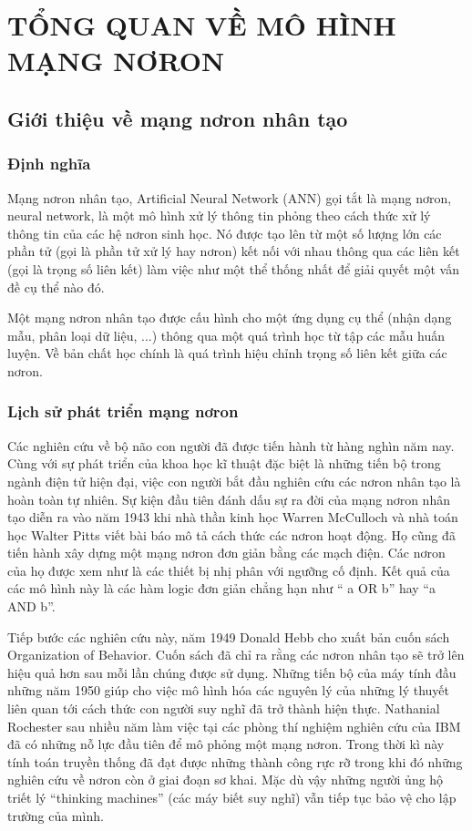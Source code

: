 \chapter{TỔNG QUAN VỀ MÔ HÌNH MẠNG NƠRON} \label{Appendix1}
\section{Giới thiệu về mạng nơron nhân tạo }
\subsection{Định nghĩa}
Mạng nơron nhân tạo, Artificial Neural Network (ANN) gọi tắt là mạng nơron, neural network, là một mô hình xử lý thông tin phỏng theo cách thức xử lý thông tin của các hệ nơron sinh học. Nó được tạo lên từ một số lượng lớn các phần tử (gọi là phần tử xử lý hay nơron) kết nối với nhau thông qua các liên kết (gọi là trọng số liên kết) làm việc như một thể thống nhất để giải quyết một vấn đề cụ thể nào đó. 

Một mạng nơron nhân tạo được cấu hình cho một ứng dụng cụ thể (nhận dạng mẫu, phân loại dữ liệu, ...) thông qua một quá trình học từ tập các mẫu huấn luyện. Về bản chất học chính là quá trình hiệu chỉnh trọng số liên kết giữa các nơron.
\subsection{Lịch sử phát triển mạng nơron}
Các nghiên cứu về bộ não con người đã được tiến hành từ hàng nghìn năm nay. Cùng với sự phát triển của khoa học kĩ thuật đặc biệt là những tiến bộ trong ngành điện tử hiện đại, việc con người bắt đầu nghiên cứu các nơron nhân tạo là hoàn toàn tự nhiên. Sự kiện đầu tiên đánh dấu sự ra đời của mạng nơron nhân tạo diễn ra vào năm 1943 khi nhà thần kinh học Warren McCulloch và nhà toán học Walter Pitts viết bài báo mô tả cách thức các nơron hoạt động. Họ cũng đã tiến hành xây dựng một mạng nơron đơn giản bằng các mạch điện. Các nơron của họ được xem như là các thiết bị nhị phân với ngưỡng cố định. Kết quả của các mô hình này là các hàm logic đơn giản chẳng hạn như “ a OR b” hay “a AND b”. 

Tiếp bước các nghiên cứu này, năm 1949 Donald Hebb cho xuất bản cuốn sách Organization of Behavior. Cuốn sách đã chỉ ra rằng các nơron nhân tạo sẽ trở lên hiệu quả hơn sau mỗi lần chúng được sử dụng. 
Những tiến bộ của máy tính đầu những năm 1950 giúp cho việc mô hình hóa các nguyên lý của những lý thuyết liên quan tới cách thức con người suy nghĩ đã trở thành hiện thực. Nathanial Rochester sau nhiều năm làm việc tại các phòng thí nghiệm nghiên cứu của IBM đã có những nỗ lực đầu tiên để mô phỏng một mạng nơron. Trong thời kì này tính toán truyền thống đã đạt được những thành công rực rỡ trong khi đó những nghiên cứu về nơron còn ở giai đoạn sơ khai. Mặc dù vậy những người ủng hộ triết lý “thinking machines” (các máy biết suy nghĩ) vẫn tiếp tục bảo vệ cho lập trường của mình. 

